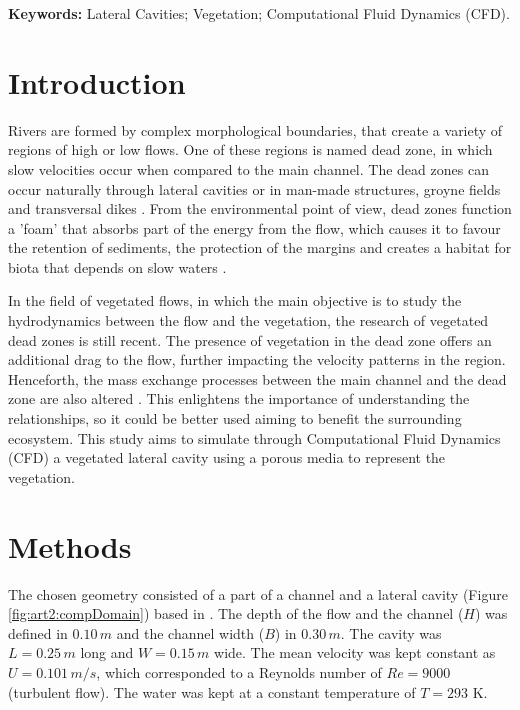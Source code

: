 \noindent\textbf{Keywords:} Lateral Cavities; Vegetation; Computational Fluid Dynamics (CFD).

\section{Introduction}
Rivers are formed by complex morphological boundaries, that create a variety of regions of high or low flows. One of these regions is named dead zone, in which slow velocities occur when compared to the main channel. The dead zones can occur naturally through lateral cavities \cite{jackson2013} or in man-made structures, groyne fields \cite{sukhodolov2017} and transversal dikes \cite{Pandey2018}. From the environmental point of view, dead zones function a 'foam' that absorbs part of the energy from the flow, which causes it to favour the retention of sediments, the protection of the margins and creates a habitat for biota that depends on slow waters \cite{Weitbrecht2008}.

In the field of vegetated flows, in which the main objective is to study the hydrodynamics between the flow and the vegetation, the research of vegetated dead zones is still recent. The presence of vegetation in the dead zone offers an additional drag to the flow, further impacting the velocity patterns in the region. Henceforth, the mass exchange processes between the main channel and the dead zone are also altered \cite{xiang2019}. This enlightens the importance of understanding the relationships, so it could be better used aiming to benefit the surrounding ecosystem. This study aims to simulate through Computational Fluid Dynamics (CFD) a vegetated lateral cavity using a porous media to represent the vegetation.

\section{Methods}
The chosen geometry consisted of a part of a channel and a lateral cavity (Figure \ref{fig:art2:compDomain}) based in \cite{xiang2019}. The depth of the flow and the channel ($H$) was defined in $0.10\,m$ and the channel width ($B$) in $0.30\,m$. The cavity was $L=0.25\,m$ long and $W=0.15\,m$ wide. The mean velocity was kept constant as $U=0.101\,m/s$, which corresponded to a Reynolds number of $Re=9000$ (turbulent flow). The water was kept at a constant temperature of $T=293$ K.

